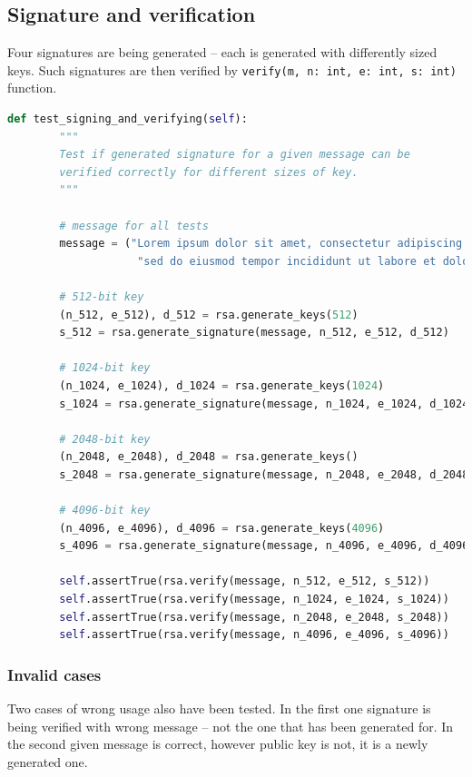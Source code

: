 \documentclass{article}
\begin{document}
\normalsize

\subsection{Signature and verification}
Four signatures are being generated -- each is generated with differently sized keys. Such
signatures are then verified by \texttt{verify(m, n: int, e: int, s: int)} function.

\small

\begin{lstlisting}[language=Python]
    def test_signing_and_verifying(self):
        """
        Test if generated signature for a given message can be
        verified correctly for different sizes of key.
        """

        # message for all tests
        message = ("Lorem ipsum dolor sit amet, consectetur adipiscing elit, ",
                    "sed do eiusmod tempor incididunt ut labore et dolore magna aliqua.")

        # 512-bit key
        (n_512, e_512), d_512 = rsa.generate_keys(512)
        s_512 = rsa.generate_signature(message, n_512, e_512, d_512)

        # 1024-bit key
        (n_1024, e_1024), d_1024 = rsa.generate_keys(1024)
        s_1024 = rsa.generate_signature(message, n_1024, e_1024, d_1024)

        # 2048-bit key
        (n_2048, e_2048), d_2048 = rsa.generate_keys()
        s_2048 = rsa.generate_signature(message, n_2048, e_2048, d_2048)

        # 4096-bit key
        (n_4096, e_4096), d_4096 = rsa.generate_keys(4096)
        s_4096 = rsa.generate_signature(message, n_4096, e_4096, d_4096)

        self.assertTrue(rsa.verify(message, n_512, e_512, s_512))
        self.assertTrue(rsa.verify(message, n_1024, e_1024, s_1024))
        self.assertTrue(rsa.verify(message, n_2048, e_2048, s_2048))
        self.assertTrue(rsa.verify(message, n_4096, e_4096, s_4096))
\end{lstlisting}

\normalsize

\subsubsection{Invalid cases}
Two cases of wrong usage also have been tested. In the first one signature is being verified with
wrong message -- not the one that has been generated for. In the second given message is correct,
however public key is not, it is a newly generated one.
\end{document}
